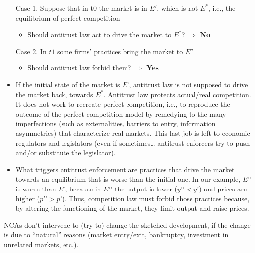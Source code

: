    \begin{itemize}
        \item[Case 1.] Suppose that in t0 the market is in \(E'\), which is not \(E^*\), i.e., the equilibrium of perfect competition
            \begin{itemize}
                \item Should antitrust law act to drive the market to \(E^*\)?
                    \(\Rightarrow\) \textbf{No}
            \end{itemize}
        \item[Case 2.] In $t1$ some firms’ practices bring the market to \(E''\)
            \begin{itemize}
                \item Should antitrust law forbid them? \(\Rightarrow\) \textbf{Yes}
            \end{itemize}
    \end{itemize}

    \begin{itemize}
        \item If the initial state of the market is $E’$, antitrust law is not supposed to drive the market back, towards $E^*$. Antitrust law protects actual/real competition. It does not work to recreate perfect competition, i.e., to reproduce the outcome of the perfect competition model by remedying to the many imperfections (such as externalities, barriers to entry, information asymmetries) that characterize real markets. This last job is left to economic regulators and legislators (even if sometimes… antitrust enforcers try to push and/or substitute the legislator).
        \item What triggers antitrust enforcement are practices that drive the market towards an equilibrium that is worse than the initial one. In our example, $E’’$ is worse than $E’$, because in $E’’$ the output is lower ($y’’<y’$) and prices are higher ($p’’>p’$). Thus, competition law must forbid those practices because, by altering the functioning of the market, they limit output and raise prices. 
    \end{itemize}

    NCAs don’t intervene to (try to) change the sketched development, if the change is due to “natural” reasons (market entry/exit, bankruptcy, investment in unrelated markets, etc.).

